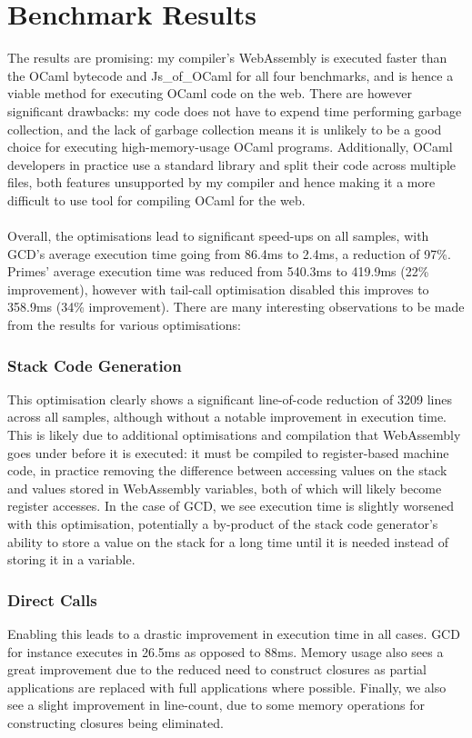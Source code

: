 \documentclass[12pt,twoside,notitlepage]{report}
\begin{document}
\section{Benchmark Results}
The results are promising: my compiler's WebAssembly is executed faster than the OCaml bytecode and Js\_of\_OCaml for all four benchmarks, and is hence a viable method for executing OCaml code on the web. There are however significant drawbacks: my code does not have to expend time performing garbage collection, and the lack of garbage collection means it is unlikely to be a good choice for executing high-memory-usage OCaml programs. Additionally, OCaml developers in practice use a standard library and split their code across multiple files, both features unsupported by my compiler and hence making it a more difficult to use tool for compiling OCaml for the web.
\\\\
Overall, the optimisations lead to significant speed-ups on all samples, with GCD's average execution time going from 86.4ms to 2.4ms, a reduction of 97\%. Primes' average execution time was reduced from 540.3ms to 419.9ms (22\% improvement), however with tail-call optimisation disabled this improves to 358.9ms (34\% improvement). There are many interesting observations to be made from the results for various optimisations:

\subsubsection{Stack Code Generation}
This optimisation clearly shows a significant line-of-code reduction of 3209 lines across all samples, although without a notable improvement in execution time. This is likely due to additional optimisations and compilation that WebAssembly goes under before it is executed: it must be compiled to register-based machine code, in practice removing the difference between accessing values on the stack and values stored in WebAssembly variables, both of which will likely become register accesses. In the case of GCD, we see execution time is slightly worsened with this optimisation, potentially a by-product of the stack code generator's ability to store a value on the stack for a long time until it is needed instead of storing it in a variable.

\subsubsection{Direct Calls}
Enabling this leads to a drastic improvement in execution time in all cases. GCD for instance executes in 26.5ms as opposed to 88ms. Memory usage also sees a great improvement due to the reduced need to construct closures as partial applications are replaced with full applications where possible. Finally, we also see a slight improvement in line-count, due to some memory operations for constructing closures being eliminated.
\end{document}
